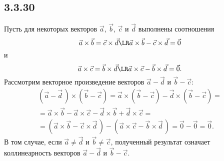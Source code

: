 \subsection{3.3.30}

Пусть для некоторых векторов $\vec a$, $\vec b$, $\vec c$ и $\vec d$ выполнены соотношения
\[
\vec a\times\vec b=\vec c\times\vec d\LR\vec a\times\vec b-\vec c\times\vec d=\vec0
\]
и
\[
\vec a\times\vec c=\vec b\times\vec d\LR\vec a\times\vec c-\vec b\times\vec d=\vec0.
\]
Рассмотрим векторное произведение векторов $\vec a-\vec d$ и $\vec b-\vec c$:
\begin{multline*}
\left(\vec a-\vec d\,\right)\times\left(\vec b-\vec c\right)=\vec a\times\left(\vec b-\vec c\right)-\vec d\times\left(\vec b-\vec c\right)= \\
=\vec a\times\vec b-\vec a\times\vec c-\vec d\times\vec b+\vec d\times\vec c= \\
=\left(\vec a\times\vec b-\vec c\times\vec d\,\right)-\left(\vec a\times\vec c-\vec b\times\vec d\,\right)=\vec0-\vec0=\vec0.
\end{multline*}
В том случае, если $\vec a\neq\vec d$ и $\vec b\neq\vec c$, полученный результат означает коллинеарность векторов $\vec a-\vec d$ и $\vec b-\vec c$.